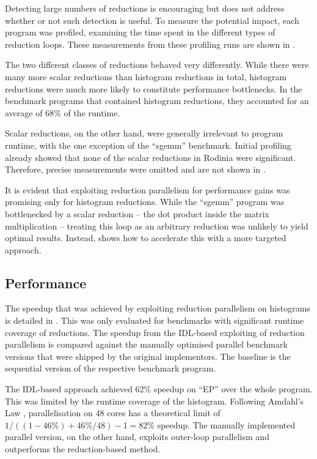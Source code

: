    Detecting large numbers of reductions is encouraging but does not address
    whether or not such detection is useful.
    To measure the potential impact, each program was profiled, examining the
    time spent in the different types of reduction loops.
    These measurements from these profiling runs are shown in
    .

    The two different classes of reductions behaved very differently.
    While there were many more scalar reductions than histogram reductions in
    total, histogram reductions were much more likely to constitute performance
    bottlenecks.
    In the benchmark programs that contained histogram reductions,
    they accounted for an average of 68\% of the runtime.

    Scalar reductions, on the other hand, were generally irrelevant to program
    runtime, with the one exception of the ``sgemm'' benchmark.
    Initial profiling already showed that none of the scalar reductions in
    Rodinia were significant.
    Therefore, precise measurements were omitted and are not shown in
    .

    It is evident that exploiting reduction parallelism for performance gains
    was promising only for histogram reductions.
    While the ``sgemm'' program was bottlenecked by a scalar reduction -- the
    dot product inside the matrix multiplication -- treating this loop as an
    arbitrary reduction was unlikely to yield optimal results.
    Instead,  shows how to accelerate this with a more
    targeted approach.

\subsection{Performance}

    The speedup that was achieved by exploiting reduction parallelism on
    histograms is detailed in .
    This was only evaluated for benchmarks with significant runtime coverage of
    reductions.
    The speedup from the IDL-based exploiting of reduction parallelism
    is compared against the manually optimised parallel benchmark versions that
    were shipped by the original implementors.
    The baseline is the sequential version of the respective benchmark program.

    The IDL-based approach achieved 62\% speedup on ``EP'' over the whole
    program.
    This was limited by the runtime coverage of the histogram.
    Following Amdahl's Law
    \citep{Amdahl:1967:VSP:1465482.1465560,Hill:2008:ALM:1449375.1449387},
    parallelisation on 48 cores has a theoretical limit of
    $1/((1-46\%)+46\%/48)-1=82\%$ speedup.
    The manually implemented parallel version, on the other hand, exploits
    outer-loop parallelism and outperforms the reduction-based method.

